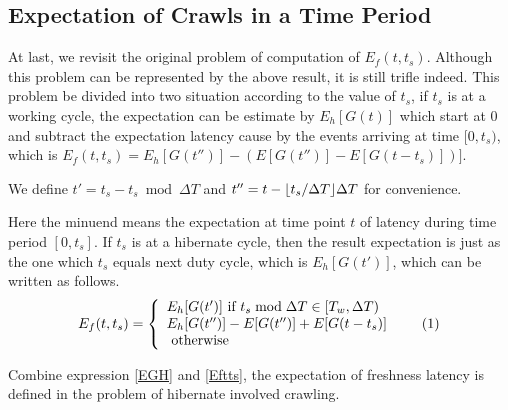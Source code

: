 \documentclass[conference]{IEEEtran}
\newcommand\numberthis{\addtocounter{equation}{1}\tag{\theequation}}
\DeclarePairedDelimiter\floor{\lfloor}{\rfloor}
\begin{document}
\subsection{Expectation of Crawls in a Time Period}

At last, we revisit the original problem of computation of $E_f(t,t_s)$. Although this problem can be represented by the above result, it is still trifle indeed. 
This problem be divided into two situation according to the value of $t_s$, if $t_s$ is at a working cycle, the expectation can be estimate by $E_h[G(t)]$ which start at $0$ and subtract the expectation latency cause by the events arriving at time $[0, t_s)$, which is $E_f(t,t_s)=E_h[G(t'')]-(E[G(t'')]-E[G(t-t_s)])]$. 

We define $t'=t_s-t_s\bmod\Delta T$ and $t''=t-\floor{t_s/\Delta T}\Delta T$ for convenience.

Here the minuend means the expectation at time point $t$ of latency during time period $[0, t_s]$.
If $t_s$ is at a hibernate cycle, then the result expectation is just as the one which $t_s$ equals next duty cycle, which is $E_h[G(t')]$, which can be written as follows.
\[E_f(t,t_s)=\left\{
    \begin{array}{lr}
    E_h[G(t')]\text{ if } t_s\bmod\Delta T\in [T_w, \Delta T)\\
    E_h[G(t'')]-E[G(t'')]+E[G(t-t_s)]\\
    \text{ otherwise }
    \end{array}\numberthis \label{Eftts}
    \right.
\]


Combine expression \eqref{EGH} and \eqref{Eftts}, the expectation of freshness latency is defined in the problem of hibernate involved crawling.

\end{document}

